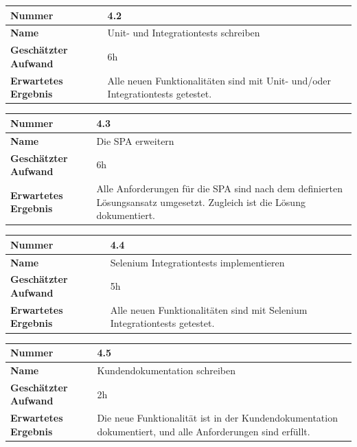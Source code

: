 \begin{longtable}{p{}|p{}}
	\hline
	\textbf{Nummer}    				& 4.2 \\
	\hline
	\textbf{Name}   				& Unit- und Integrationtests schreiben  \\
	\hline
	\textbf{Geschätzter Aufwand}	& 6h \\
	\hline
	\textbf{Erwartetes Ergebnis}	& Alle neuen Funktionalitäten sind mit Unit- und/oder Integrationtests getestet.\\
	\hline
\end{longtable}


\begin{longtable}{p{}|p{}}
	\hline
	\textbf{Nummer}    				& 4.3 \\
	\hline
	\textbf{Name}   				& Die SPA erweitern  \\
	\hline
	\textbf{Geschätzter Aufwand}	& 6h \\
	\hline
	\textbf{Erwartetes Ergebnis}	& Alle Anforderungen für die SPA sind nach dem definierten Lösungsansatz umgesetzt. Zugleich ist die Lösung dokumentiert.\\
	\hline
\end{longtable}

\begin{longtable}{p{}|p{}}
	\hline
	\textbf{Nummer}    				& 4.4 \\
	\hline
	\textbf{Name}   				& Selenium Integrationtests implementieren  \\
	\hline
	\textbf{Geschätzter Aufwand}	& 5h \\
	\hline
	\textbf{Erwartetes Ergebnis}	& Alle neuen Funktionalitäten sind mit Selenium Integrationtests getestet.\\
	\hline
\end{longtable}\pagebreak

\begin{longtable}{p{}|p{}}
	\hline
	\textbf{Nummer}    				& 4.5 \\
	\hline
	\textbf{Name}   				& Kundendokumentation schreiben  \\
	\hline
	\textbf{Geschätzter Aufwand}	& 2h \\
	\hline
	\textbf{Erwartetes Ergebnis}	& Die neue Funktionalität ist in der Kundendokumentation dokumentiert, und alle Anforderungen sind erfüllt.\\
	\hline
\end{longtable}


